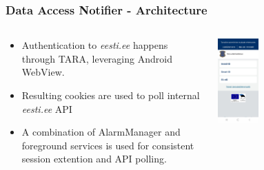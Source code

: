 \documentclass[aspectratio=169,11pt]{beamer}
\begin{document}
\begin{frame}
\frametitle{Data Access Notifier - Architecture}

\begin{columns}[t]
\begin{column}{0.40\textwidth}
\begin{itemize}
    \item Authentication to \textit{eesti.ee} happens through TARA, leveraging Android WebView.
    \item Resulting cookies are used to poll internal \textit{eesti.ee} API
    \item A combination of AlarmManager and foreground services is used for consistent session extention and API polling.

\end{itemize}
\end{column}

\begin{column}{0.60\textwidth}
\begin{center}
\includegraphics[width=0.3\textwidth]{../english/figures/Screenshot_20250812_212238_Data Access Notifier.jpg}
\end{center}
\end{column}
\end{columns}
\end{frame}
\end{document}

